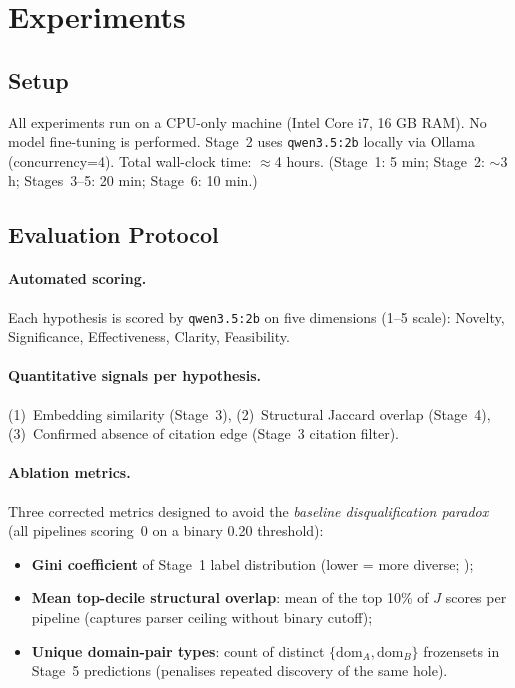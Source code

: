 \documentclass[11pt]{article}
\begin{document}
\section{Experiments}

\subsection{Setup}

All experiments run on a CPU-only machine (Intel Core i7, 16 GB RAM).
No model fine-tuning is performed. Stage~2 uses \texttt{qwen3.5:2b}
locally via Ollama (concurrency=4). Total wall-clock time: $\approx$4 hours.
(Stage~1: 5 min; Stage~2: $\sim$3 h; Stages~3--5: 20 min; Stage~6: 10 min.)

\subsection{Evaluation Protocol}

\paragraph{Automated scoring.}
Each hypothesis is scored by \texttt{qwen3.5:2b} on five dimensions (1--5
scale): Novelty, Significance, Effectiveness, Clarity, Feasibility.

\paragraph{Quantitative signals per hypothesis.}
(1)~Embedding similarity (Stage~3), (2)~Structural Jaccard overlap (Stage~4),
(3)~Confirmed absence of citation edge (Stage~3 citation filter).

\paragraph{Ablation metrics.}
Three corrected metrics designed to avoid the \emph{baseline disqualification
paradox} (all pipelines scoring~0 on a binary 0.20 threshold):
\begin{itemize}
\item \textbf{Gini coefficient} of Stage~1 label distribution
  (lower = more diverse; \citealp{lorenz1905methods});
\item \textbf{Mean top-decile structural overlap}: mean of the top 10\%
  of $J$ scores per pipeline (captures parser ceiling without binary cutoff);
\item \textbf{Unique domain-pair types}: count of distinct
  $\{\text{dom}_A, \text{dom}_B\}$ frozensets in Stage~5 predictions
  (penalises repeated discovery of the same hole).
\end{itemize}
\end{document}
